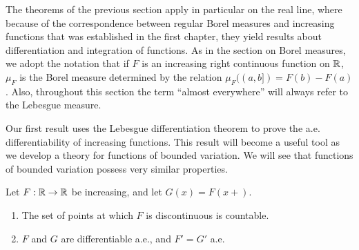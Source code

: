 \documentclass[12pt]{article} %
\begin{document}
The theorems of the previous section apply in particular on the real line, where because of the correspondence between regular Borel measures and increasing functions that was established in the first chapter, they yield results about differentiation and integration of functions. As in the section on Borel measures, we adopt the notation that if $F$ is an increasing right continuous function on $\mathbb{R}$, $\mu_F$ is the Borel measure determined by the relation $\mu_F((a, b]) = F(b) - F(a)$. Also, throughout this section the term ``almost everywhere'' will always refer to the Lebesgue measure.

Our first result uses the Lebesgue differentiation theorem to prove the a.e. differentiability of increasing functions. This result will become a useful tool as we develop a theory for functions of bounded variation. We will see that functions of bounded variation possess very similar properties.

\begin{theorem}\label{thm:3.23}
    Let $F : \mathbb{R} \to \mathbb{R}$ be increasing, and let $G(x) = F(x+)$. \begin{enumerate}
        \item The set of points at which $F$ is discontinuous is countable.
        \item $F$ and $G$ are differentiable a.e., and $F' = G'$ a.e.
    \end{enumerate}
\end{theorem}
\end{document}

